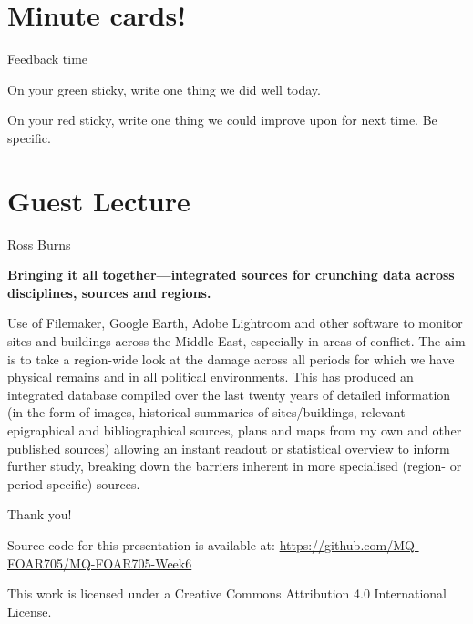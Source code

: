 \documentclass[aspectratio=1610, 11pt]{beamer} %
\begin{document}
\section{Minute cards!}
\begin{frame}{Feedback time}

On your green sticky, write one thing we did well today.

On your red sticky, write one thing we could improve upon for next time. Be specific. 

\end{frame}

\section{Guest Lecture}
\begin{frame}{Ross Burns}

{\bf Bringing it all together—integrated sources for crunching data across disciplines, sources and regions.}

Use of Filemaker, Google Earth, Adobe Lightroom and other software to monitor sites and buildings across the Middle East, especially in areas of conflict. The aim is to take a region-wide look at the damage across all periods for which we have physical remains and in all political environments. This has produced an integrated database compiled over the last twenty years of detailed information (in the form of images, historical summaries of sites/buildings, relevant epigraphical and bibliographical sources, plans and maps from my own and other published sources) allowing an instant readout or statistical overview to inform further study, breaking down the barriers inherent in more specialised (region- or period-specific) sources.
    
\end{frame}


% 
% 


  
%   
%   


\begin{frame}{Thank you!}


Source code for this presentation is available at: \url{https://github.com/MQ-FOAR705/MQ-FOAR705-Week6}

This work is licensed under a Creative Commons Attribution 4.0 International License.

\end{frame}
\end{document}
